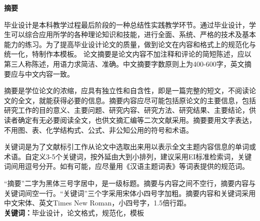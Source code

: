 

\begin{center}\heiti\sanhao\textbf{
        摘要
    }
\end{center}

毕业设计是本科教学过程最后阶段的一种总结性实践教学环节。通过毕业设计，学生可以综合应用所学的各种理论知识和技能，进行全面、系统、严格的技术及基本能力的练习。为了提高毕业设计论文的质量，做到论文在内容和格式上的规范化与统一化，特制作本模板。
论文摘要是论文内容不加注释和评论的简短陈述，应以第三人称陈述，用语力求简洁、准确。中文摘要字数原则上为400-600字，英文摘要应与中文内容一致。

摘要是学位论文的浓缩，应具有独立性和自含性，即是一篇完整的短文，不阅读论文的全文，就能获得必要的信息。摘要内容应尽可能包括原论文的主要信息，包括研究工作的目的意义、主要问题、研究内容、研究方法、研究结果、主要结论，供读者确定有无必要阅读全文，也供文摘汇编等二次文献采用。摘要要用文字表达，不用图、表、化学结构式、公式、非公知公用的符号和术语。 

关键词是为了文献标引工作从论文中选取出来用以表示全文主题内容信息的单词或术语。自定义3-5个关键词，按外延由大到小排列，建议采用EI标准检索词，关键词间用逗号分开。如有可能，应尽量用《汉语主题词表》等词表提供的规范词。

“摘要”二字为黑体三号字居中，是一级标题。摘要与内容之间不空行，摘要内容与关键词间空一行。“关键词”三个字采用宋体小四号字加粗。摘要内容和关键词采用中文宋体、英文Times New Roman，小四号字，1.5倍行距。\\



  
\quad \noindent \textbf{关键词：}毕业设计，论文格式，规范化，模板

\clearpage